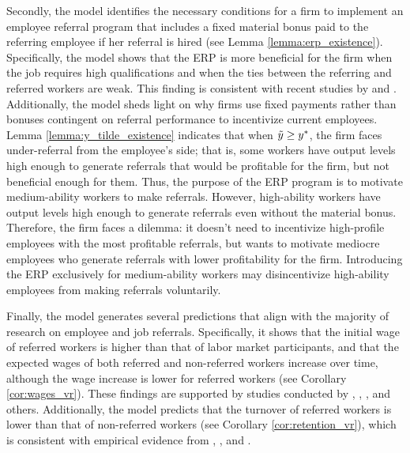 \documentclass[12pt]{article}
\begin{document}
Secondly, the model identifies the necessary conditions for a firm to implement an employee referral program that includes a fixed material bonus paid to the referring employee if her referral is hired (see Lemma \ref{lemma:erp_existence}). Specifically, the model shows that the ERP is more beneficial for the firm when the job requires high qualifications and when the ties between the referring and referred workers are weak. This finding is consistent with recent studies by \cite{friebel2023employee} and \cite{lester2021heterogeneous}. Additionally, the model sheds light on why firms use fixed payments rather than bonuses contingent on referral performance to incentivize current employees. Lemma \ref{lemma:y_tilde_existence} indicates that when $\Tilde{y} \geq y^*$, the firm faces under-referral from the employee's side; that is, some workers have output levels high enough to generate referrals that would be profitable for the firm, but not beneficial enough for them. Thus, the purpose of the ERP program is to motivate medium-ability workers to make referrals. However, high-ability workers have output levels high enough to generate referrals even without the material bonus. Therefore, the firm faces a dilemma: it doesn't need to incentivize high-profile employees with the most profitable referrals, but wants to motivate mediocre employees who generate referrals with lower profitability for the firm. Introducing the ERP exclusively for medium-ability workers may disincentivize high-ability employees from making referrals voluntarily.

Finally, the model generates several predictions that align with the majority of research on employee and job referrals. Specifically, it shows that the initial wage of referred workers is higher than that of labor market participants, and that the expected wages of both referred and non-referred workers increase over time, although the wage increase is lower for referred workers (see Corollary \ref{cor:wages_vr}). These findings are supported by studies conducted by \cite{corcoran1980most}, \cite{montgomery1991social}, \cite{dustmann2016referral}, and others. Additionally, the model predicts that the turnover of referred workers is lower than that of non-referred workers (see Corollary \ref{cor:retention_vr}), which is consistent with empirical evidence from \cite{pallais2016referential}, \cite{lalanne2016old}, and \cite{lalanne2021social}.
\end{document}
